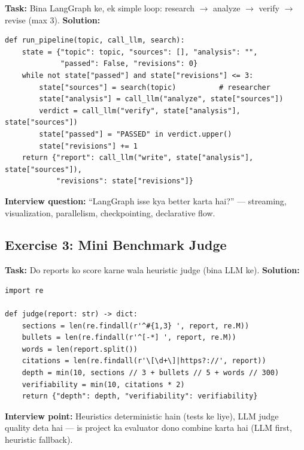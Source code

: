 \begin{codestorybox}
\textbf{Task:} Bina LangGraph ke, ek simple loop: research $\rightarrow$ analyze $\rightarrow$ verify $\rightarrow$ revise (max 3). \textbf{Solution:}

\begin{lstlisting}[style=pythonstyle, caption={mini agent loop}]
def run_pipeline(topic, call_llm, search):
    state = {"topic": topic, "sources": [], "analysis": "",
             "passed": False, "revisions": 0}
    while not state["passed"] and state["revisions"] <= 3:
        state["sources"] = search(topic)          # researcher
        state["analysis"] = call_llm("analyze", state["sources"])
        verdict = call_llm("verify", state["analysis"], state["sources"])
        state["passed"] = "PASSED" in verdict.upper()
        state["revisions"] += 1
    return {"report": call_llm("write", state["analysis"], state["sources"]),
            "revisions": state["revisions"]}
\end{lstlisting}

\textbf{Interview question:} ``LangGraph isse kya better karta hai?'' --- streaming, visualization, parallelism, checkpointing, declarative flow.
\end{codestorybox}

\subsection{Exercise 3: Mini Benchmark Judge}

\begin{codestorybox}
\textbf{Task:} Do reports ko score karne wala heuristic judge (bina LLM ke). \textbf{Solution:}

\begin{lstlisting}[style=pythonstyle, caption={mini heuristic judge}]
import re

def judge(report: str) -> dict:
    sections = len(re.findall(r'^#{1,3} ', report, re.M))
    bullets = len(re.findall(r'^[-*] ', report, re.M))
    words = len(report.split())
    citations = len(re.findall(r'\[\d+\]|https?://', report))
    depth = min(10, sections // 3 + bullets // 5 + words // 300)
    verifiability = min(10, citations * 2)
    return {"depth": depth, "verifiability": verifiability}
\end{lstlisting}

\textbf{Interview point:} Heuristics deterministic hain (tests ke liye), LLM judge quality deta hai --- is project ka evaluator dono combine karta hai (LLM first, heuristic fallback).
\end{codestorybox}

